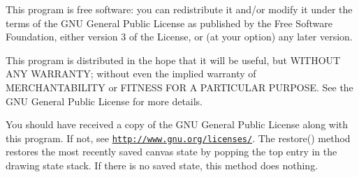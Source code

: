 This program is free software\+: you can redistribute it and/or modify it under the terms of the G\+N\+U General Public License as published by the Free Software Foundation, either version 3 of the License, or (at your option) any later version.

This program is distributed in the hope that it will be useful, but W\+I\+T\+H\+O\+U\+T A\+N\+Y W\+A\+R\+R\+A\+N\+T\+Y; without even the implied warranty of M\+E\+R\+C\+H\+A\+N\+T\+A\+B\+I\+L\+I\+T\+Y or F\+I\+T\+N\+E\+S\+S F\+O\+R A P\+A\+R\+T\+I\+C\+U\+L\+A\+R P\+U\+R\+P\+O\+S\+E. See the G\+N\+U General Public License for more details.

You should have received a copy of the G\+N\+U General Public License along with this program. If not, see \href{http://www.gnu.org/licenses/}{\tt http\+://www.\+gnu.\+org/licenses/}. The restore() method restores the most recently saved canvas state by popping the top entry in the drawing state stack. If there is no saved state, this method does nothing. 